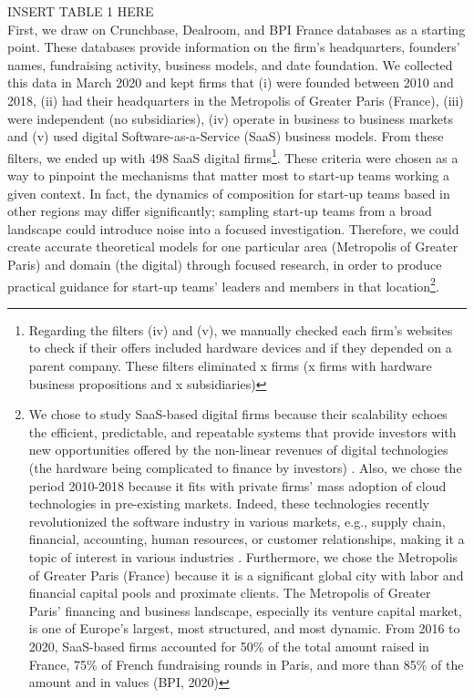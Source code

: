 \documentclass[12pt]{article}
\begin{document}
INSERT TABLE 1 HERE \\

First, we draw on Crunchbase, Dealroom, and BPI France databases as a starting point. These databases provide information on the firm's headquarters, founders' names, fundraising activity, business models, and date foundation. We collected this data in March 2020 and kept firms that (i) were founded between 2010 and 2018, (ii) had their headquarters in the Metropolis of Greater Paris (France), (iii) were independent (no subsidiaries), (iv) operate in business to business markets and (v) used digital Software-as-a-Service (SaaS) business models. From these filters, we ended up with 498 SaaS digital firms\footnote{Regarding the filters (iv) and (v), we manually checked each firm's websites to check if their offers included hardware devices and if they depended on a parent company. These filters eliminated x firms (x firms with hardware business propositions and x subsidiaries)}. These criteria were chosen as a way to pinpoint the mechanisms that matter most to start-up teams working a given context. In fact, the dynamics of composition for start-up teams based in other regions may differ significantly; sampling start-up teams from a broad landscape could introduce noise into a focused investigation. Therefore, we could create accurate theoretical models for one particular area (Metropolis of Greater Paris) and domain (the digital) through focused research, in order to produce practical guidance for start-up teams' leaders and members in that location\footnote{We chose to study SaaS-based digital firms because their scalability echoes the efficient, predictable, and repeatable systems that provide investors with new opportunities offered by the non-linear revenues of digital technologies (the hardware being complicated to finance by investors) \citep{nambisan2017digital}. Also, we chose the period 2010-2018 because it fits with private firms' mass adoption of cloud technologies in pre-existing markets. Indeed, these technologies recently revolutionized the software industry in various markets, e.g., supply chain, financial, accounting, human resources, or customer relationships, making it a topic of interest in various industries \citep{luoma2018exploring}. Furthermore, we chose the Metropolis of Greater Paris (France) because it is a significant global city with labor and financial capital pools and proximate clients. The Metropolis of Greater Paris' financing and business landscape, especially its venture capital market, is one of Europe's largest, most structured, and most dynamic. From 2016 to 2020, SaaS-based firms accounted for 50\% of the total amount raised in France, 75\% of French fundraising rounds in Paris, and more than 85\% of the amount and in values (BPI, 2020)}. \\
\end{document}

